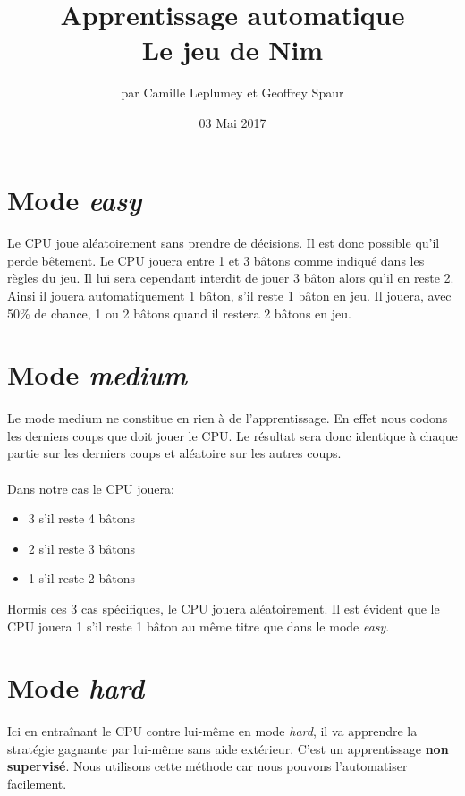\documentclass{article}
\title{Apprentissage automatique \\ Le jeu de Nim}
\author{par Camille Leplumey et Geoffrey Spaur}
\date{03 Mai 2017}
\begin{document}
\maketitle
\newpage
\tableofcontents{}
\newpage
\section{Mode \emph{easy}}
  \paragraph{}
    Le CPU joue aléatoirement sans prendre de décisions. Il est donc possible qu'il perde bêtement. 
    Le CPU jouera entre 1 et 3 bâtons comme indiqué dans les règles du jeu.
    Il lui sera cependant interdit de jouer 3 bâton alors qu'il en reste 2. Ainsi il jouera automatiquement 1 bâton, s'il reste 1 bâton en jeu.
    Il jouera, avec 50\% de chance, 1 ou 2 bâtons quand il restera 2 bâtons en jeu.
\section{Mode \emph{medium}}
  \paragraph{}
    Le mode medium ne constitue en rien à de l'apprentissage. En effet nous codons les derniers coups que doit
    jouer le CPU. Le résultat sera donc identique à chaque partie sur les derniers coups et aléatoire sur les autres coups.
  \paragraph{}
    Dans notre cas le CPU jouera:
    \begin{itemize}
     \item 3 s'il reste 4 bâtons
     \item 2 s'il reste 3 bâtons
     \item 1 s'il reste 2 bâtons
    \end{itemize}
    Hormis ces 3 cas spécifiques, le CPU jouera aléatoirement. Il est évident que le CPU jouera 1 s'il reste 1 bâton au même titre que dans le mode \emph{easy}.
    
\newpage
\section{Mode \emph{hard}}
  \paragraph{}
    Ici en entraînant le CPU contre lui-même en mode \emph{hard}, il va apprendre la stratégie gagnante par lui-même sans aide extérieur. 
    C'est un apprentissage \textbf{non supervisé}. Nous utilisons cette méthode car nous pouvons l'automatiser facilement.
  
\end{document}
